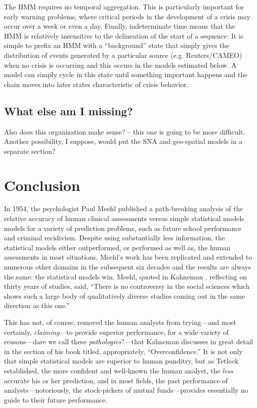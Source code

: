 \documentclass[graybox]{svmult}
\begin{document}
The HMM requires no temporal aggregation. This is particularly important for early warning
problems, where critical periods in the development of a crisis may occur over a week or even a
day. Finally, indeterminate time means that the HMM is relatively insensitive to the delineation
of the start of a sequence: It is simple to prefix an HMM with a ``background'' state that simply
gives the distribution of events generated by a particular source (e.g. Reuters/CAMEO) when no
crisis is occurring and this occurs in the models estimated below. A model can simply cycle in
this state until something important happens and the chain moves into later states characteristic
of crisis behavior.


\subsection{What else am I missing?}
\label{subsec:missing2}

Also does this organization make sense? -- this one is going to be more difficult. Another possibility, I suppose, would put the SNA and geo-spatial models in a separate section?


\section{Conclusion}
\label{sec:conclusion}

In 1954, the psychologist Paul Meehl \cite{Meehl54} published a path-breaking analysis of the relative accuracy of human clinical assessments versus simple statistical models models for a variety of prediction problems, such as future school performance and criminal recidivism. Despite using substantially less information, the statistical models either outperformed, or performed as well as, the human assessments in most situations. Meehl's work has been replicated and extended to numerous other domains in the subsequent six decades and the results are always the same: the statistical models win. Meehl, quoted in Kahneman \cite[chpt. 21]{Kahneman11}, reflecting on thirty years of studies, said, ``There is no controversy in the social sciences which shows such a large body of qualitatively diverse studies coming out in the same direction as this one.''

This has not, of course, removed the human analysts from trying---and most certainly, \textit{claiming}---to provide superior performance, for a wide variety of reasons---dare we call these \textit{pathologies}?---that Kahneman \cite[Part 3] {Kahneman11} discusses in great detail in the section of his book titled, appropriately, ``Overconfidence.'' It is not only that simple statistical models are superior to human punditry, but as Tetlock \cite{Tetlock05} established, the more confident and well-known the human analyst, the \textit{less} accurate his or her prediction, and in most fields, the past performance of analysts---notoriously, the stock-pickers of mutual funds---provides essentially no guide to their future performance.
\end{document}
